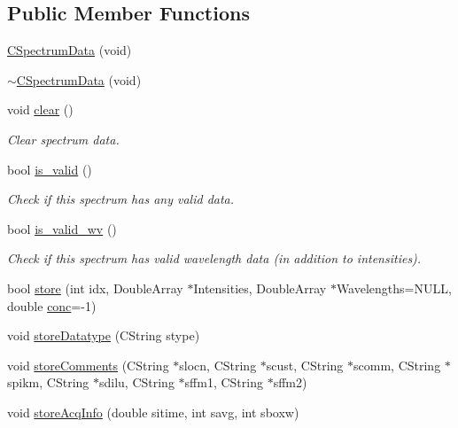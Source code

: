 \subsection*{Public Member Functions}
\begin{DoxyCompactItemize}
\item 
\hyperlink{classCSpectrumData_a83127145f1077f2873f4fb973999a111}{CSpectrumData} (void)
\item 
\hyperlink{classCSpectrumData_a2ec716faa508a12f6ce4fead83182040}{$\sim$CSpectrumData} (void)
\item 
void \hyperlink{classCSpectrumData_a035e008c928688a608c7ebed62466874}{clear} ()
\begin{DoxyCompactList}\small\item\em Clear spectrum data. \item\end{DoxyCompactList}\item 
bool \hyperlink{classCSpectrumData_a0b6c10bed83acd9d8ba2c27a66ab5376}{is\_\-valid} ()
\begin{DoxyCompactList}\small\item\em Check if this spectrum has any valid data. \item\end{DoxyCompactList}\item 
bool \hyperlink{classCSpectrumData_a0885ed0446e16b291827c41d060088d5}{is\_\-valid\_\-wv} ()
\begin{DoxyCompactList}\small\item\em Check if this spectrum has valid wavelength data (in addition to intensities). \item\end{DoxyCompactList}\item 
bool \hyperlink{classCSpectrumData_a094ec6dc1684e9fc3a9c20e5868d5622}{store} (int idx, DoubleArray $\ast$Intensities, DoubleArray $\ast$Wavelengths=NULL, double \hyperlink{classCSpectrumData_acc551c43a27ec0448a0b24d53ddc2075}{conc}=-\/1)
\item 
void \hyperlink{classCSpectrumData_a13ccf66c11466444d81abd5bb5884353}{storeDatatype} (CString stype)
\item 
void \hyperlink{classCSpectrumData_a5282784ed720846868186e27eb6bb5df}{storeComments} (CString $\ast$slocn, CString $\ast$scust, CString $\ast$scomm, CString $\ast$spikm, CString $\ast$sdilu, CString $\ast$sffm1, CString $\ast$sffm2)
\item 
void \hyperlink{classCSpectrumData_aa5034f790acb1fe45e8c7b53d6e7134e}{storeAcqInfo} (double sitime, int savg, int sboxw)

\end{DoxyCompactItemize}

